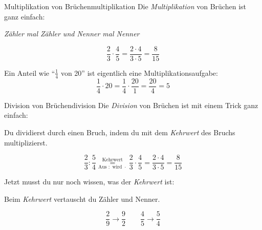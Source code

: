 \documentclass[12pt,a5paper,landscape]{scrartcl}
\begin{document}
	\begin{hilfekarte}{Multiplikation von Brüchen}{multiplikation}
		Die \emph{Multiplikation} von Brüchen ist ganz einfach:
		
		\begin{center}\itshape
			Zähler mal Zähler und Nenner mal Nenner
		\end{center}
		\[ \frac{2}{3}\cdot \frac{4}{5} = \frac{2\cdot 4}{3\cdot 5} = \frac{8}{15} \]
		
		\vspace{1cm}
		Ein Anteil wie \enquote{$\tfrac{1}{4}$ von 20} ist eigentlich eine Multiplikationsaufgabe:
		\[ \frac{1}{4}\cdot 20 = \frac{1}{4}\cdot \frac{20}{1} = \frac{20}{4} = 5 \]
	\end{hilfekarte}
	
	\begin{hilfekarte}{Division von Brüchen}{division}
		Die \emph{Division} von Brüchen ist mit einem Trick ganz einfach:
		
		\begin{center}
			Du dividierst durch einen Bruch, indem du mit dem \emph{Kehrwert} des Bruchs multiplizierst.
		\end{center}
		\[ \frac{2}{3}: \frac{5}{4} \overset{\text{Kehrwert}}{\underset{\text{Aus }:
		\text{ wird }\cdot}{=}} \frac{2}{3}\cdot  \frac{4}{5} = \frac{2\cdot 4}{3\cdot 5} = \frac{8}{15} \]
		
		\vspace{1cm}
		Jetzt musst du nur noch wissen, was der \emph{Kehrwert} ist:
		\begin{center}
			Beim \emph{Kehrwert} vertauscht du Zähler und Nenner.
		\end{center}
		\[ \frac{2}{9} \rightarrow \frac{9}{2} \qquad \frac{4}{5} \rightarrow \frac{5}{4}\]
	\end{hilfekarte}
		
\end{document}

